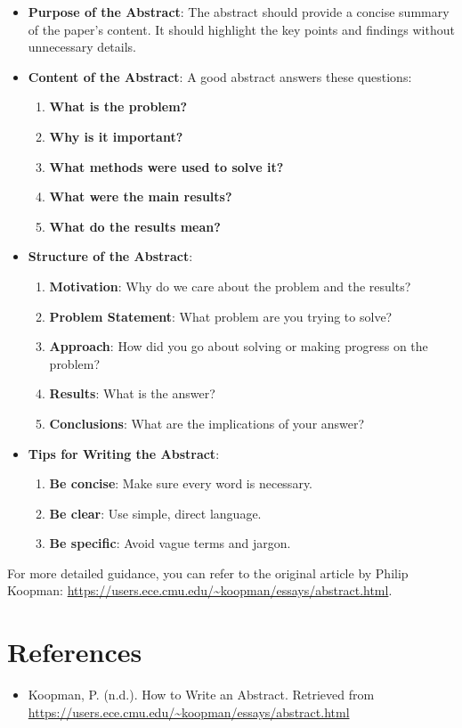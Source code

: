 \documentclass[12pt]{article}
\begin{document}
\begin{itemize}
    \item \textbf{Purpose of the Abstract}: The abstract should provide a concise summary of the paper's content. It should highlight the key points and findings without unnecessary details.
    \item \textbf{Content of the Abstract}: A good abstract answers these questions:
    \begin{enumerate}
        \item \textbf{What is the problem?}
        \item \textbf{Why is it important?}
        \item \textbf{What methods were used to solve it?}
        \item \textbf{What were the main results?}
        \item \textbf{What do the results mean?}
    \end{enumerate}
    \item \textbf{Structure of the Abstract}:
    \begin{enumerate}
        \item \textbf{Motivation}: Why do we care about the problem and the results?
        \item \textbf{Problem Statement}: What problem are you trying to solve?
        \item \textbf{Approach}: How did you go about solving or making progress on the problem?
        \item \textbf{Results}: What is the answer?
        \item \textbf{Conclusions}: What are the implications of your answer?
    \end{enumerate}
    \item \textbf{Tips for Writing the Abstract}:
    \begin{enumerate}
        \item \textbf{Be concise}: Make sure every word is necessary.
        \item \textbf{Be clear}: Use simple, direct language.
        \item \textbf{Be specific}: Avoid vague terms and jargon.
    \end{enumerate}
\end{itemize}

For more detailed guidance, you can refer to the original article by Philip Koopman: \url{https://users.ece.cmu.edu/~koopman/essays/abstract.html}.

\section*{References}

\begin{itemize}
    \item Koopman, P. (n.d.). How to Write an Abstract. Retrieved from \url{https://users.ece.cmu.edu/~koopman/essays/abstract.html}
\end{itemize}
\end{document}
